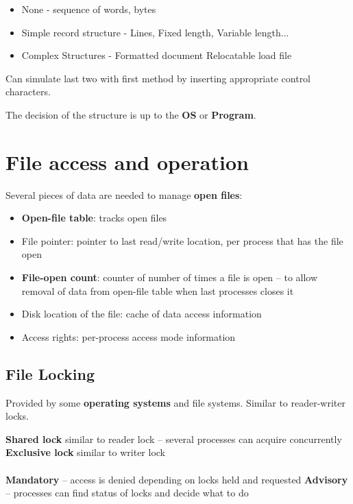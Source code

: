 \begin{itemize}
    \item None - sequence of words, bytes
    \item Simple record structure - Lines, Fixed length, Variable length...
    \item Complex Structures - Formatted document Relocatable load file
\end{itemize}

Can simulate last two with first method by inserting appropriate
control characters.

The decision of the structure is up to the \textbf{OS} or \textbf{Program}.

\section{File access and operation}

Several pieces of data are needed to manage \textbf{open files}:

\begin{itemize}
    \item \textbf{Open-file table}: tracks open files
    \item File pointer: pointer to last read/write location, per process that has the file open
    \item \textbf{File-open count}: counter of number of times a file is open – to allow removal of data from open-file table when last processes closes it
    \item Disk location of the file: cache of data access information
    \item Access rights: per-process access mode information
\end{itemize}

\subsection{File Locking}
Provided by some\textbf{ operating systems} and file systems. Similar to reader-writer locks.

\textbf{Shared lock} similar to reader lock – several processes can acquire concurrently
\textbf{Exclusive lock} similar to writer lock

\paragraph{}

\textbf{Mandatory} – access is denied depending on locks held and requested
\textbf{Advisory} – processes can find status of locks and decide what to do


